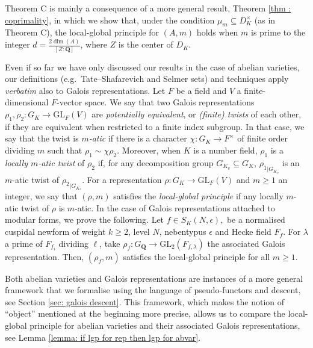 \documentclass[a4paper,10pt]{amsart}
\theoremstyle{plain}
\newenvironment{theoremintro}[1]
  {\renewcommand\theinnertheoremintro{#1}\innertheoremintro}
  {\endinnertheoremintro}
\theoremstyle{definition}
\theoremstyle{remark}
\def\Q{\mathbf Q}
\def\GL{\mathrm{GL}}
\begin{document}
Theorem C is mainly a consequence of a more general result, Theorem \ref{thm : coprimality}, in which we show that, under the condition \(\mu_m\subseteq D_K^\times\) (as in Theorem C), the local-global principle for \((A,m)\) holds when \(m\) is prime to the integer \(d = \frac{2\dim(A)}{[Z:\Q]}\), where \(Z\) is the center of \(D_K\). 


Even if so far we have only discussed our results in the case of abelian varieties, 
our definitions (e.g.\ Tate--Shafarevich and Selmer sets) and techniques apply \emph{verbatim} also to Galois representations.  
Let \(F\) be a field and \(V\) a finite-dimensional \(F\)-vector space. We say that two Galois representations \(\rho_1, \rho_2 \colon G_K \to \GL_F(V)\) are \emph{potentially equivalent}, or \emph{(finite) twists} of each other, if they are equivalent when restricted to a finite index subgroup. In that case, we say that the twist is \emph{\(m\)-atic} if there is a character \(\chi \colon G_K \to F^\times\) of finite order dividing \(m\) such that \(\rho_1 \sim \chi \rho_2\). Moreover, when \(K\) is a number field, \(\rho_1\) is a \emph{locally \(m\)-atic twist} of \(\rho_2\) if, for any decomposition group \(G_{K_v} \subseteq G_K\), \({\rho_1}_{|G_{K_v}}\) is an \(m\)-atic twist of \({\rho_2}_{|G_{K_v}}\). For a representation \(\rho\colon G_K \to \GL_F(V)\) and \(m\ge 1\) an integer, we say that \((\rho, m)\) satisfies the \emph{local-global principle} if any locally \(m\)-atic twist of \(\rho\) is \(m\)-atic. In the case of Galois representations attached to modular forms, we prove the following. 
\begin{theoremintro}{D}[{Corollary \ref{corollary: lgp for mod forms}}]
Let \(f \in S_{K}(N, \epsilon),\) be a normalised cuspidal newform of weight \(k \ge 2\), level \(N\), nebentypus \(\epsilon\) and Hecke field \(F_{f}\). For \(\lambda\) a prime of \(F_{f_i}\) dividing \(\ell\), take \(\rho_f \colon G_\Q \to \GL_2(F_{f, \lambda})\) the associated Galois representation. Then, \((\rho_f, m)\) satisfies the local-global principle for all \(m \ge 1\).
\end{theoremintro}

Both abelian varieties and Galois representations are instances of a more general framework that we formalise using the language of pseudo-functors and descent, see Section \ref{sec: galois descent}. This framework, which makes the notion of ``object'' mentioned at the beginning more precise, allows us to compare the local-global principle for abelian varieties and their associated Galois representations, see Lemma \ref{lemma: if lgp for rep then lgp for abvar}. 
\end{document}
